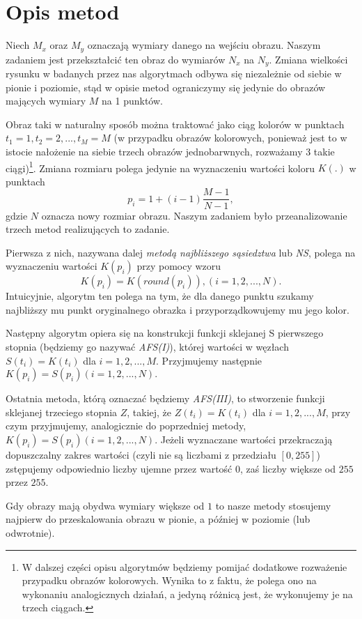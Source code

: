 \section{Opis metod}
Niech $M_x$ oraz $M_y$ oznaczają wymiary danego na wejściu obrazu. Naszym
zadaniem jest przekształcić ten obraz do wymiarów $N_x$ na $N_y$. Zmiana
wielkości rysunku w badanych przez nas algorytmach odbywa się niezależnie od
siebie w pionie i poziomie, stąd w opisie metod ograniczymy się jedynie do
obrazów mających wymiary $M$ na 1 punktów.

Obraz taki w naturalny sposób można traktować jako ciąg kolorów w punktach
$t_1=1,t_2=2,...,t_M=M$ (w przypadku obrazów kolorowych, ponieważ jest to w
istocie nałożenie na siebie trzech obrazów jednobarwnych, rozważamy 3 takie
ciągi)\footnote{W dalszej części opisu algorytmów będziemy pomijać dodatkowe
rozważenie przypadku obrazów kolorowych. Wynika to z faktu, że polega ono na
wykonaniu analogicznych działań, a jedyną różnicą jest, że wykonujemy je na
trzech ciągach.}. Zmiana rozmiaru polega jedynie na wyznaczeniu wartości koloru
$K(.)$ w punktach
$$p_i=1+(i-1)\frac{M-1}{N-1},$$
gdzie $N$ oznacza nowy rozmiar obrazu. Naszym zadaniem było przeanalizowanie
trzech metod realizujących to zadanie.

Pierwsza z nich, nazywana dalej \textit{metodą najbliższego sąsiedztwa} lub \textit{NS}, polega
na wyznaczeniu wartości $K(p_i)$ przy pomocy wzoru
$$K(p_i)=K(round(p_i)), (i=1,2,...,N).$$
Intuicyjnie, algorytm ten polega na tym, że dla danego punktu szukamy najbliższy
mu punkt oryginalnego obrazka i przyporządkowujemy mu jego kolor.

Następny algorytm opiera się na konstrukcji funkcji sklejanej S pierwszego
stopnia (będziemy go nazywać \textit{AFS(I)}), której wartości w węzłach $S(t_i)
=K(t_i)$ dla $i=1,2,...,M$. Przyjmujemy następnie $K(p_i)=S(p_i) (i=1,2,...,N).$

Ostatnia metoda, którą oznaczać będziemy \textit{AFS(III)}, to stworzenie
funkcji sklejanej trzeciego stopnia $Z$, takiej, że $Z(t_i)=K(t_i)$ dla
$i=1,2,...,M$, przy czym przyjmujemy, analogicznie do poprzedniej metody,
$K(p_i)=S(p_i) (i=1,2,...,N)$. Jeżeli wyznaczane wartości przekraczają
dopuszczalny zakres wartości (czyli nie są liczbami z przedziału $[0,255]$)
zstępujemy odpowiednio liczby ujemne przez wartość $0$, zaś liczby większe od
$255$ przez $255$.

Gdy obrazy mają obydwa wymiary większe od $1$ to nasze metody stosujemy najpierw
do przeskalowania obrazu w pionie, a później w poziomie (lub odwrotnie).

